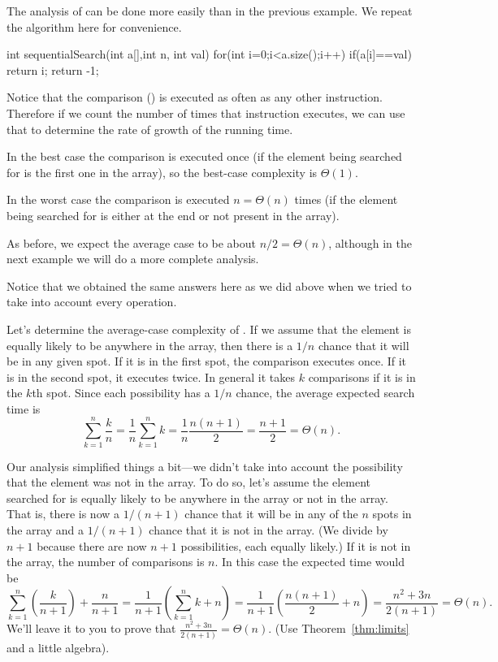 \begin{exa}
The analysis of  can be done more easily than in the
previous example.  
We repeat the algorithm here for convenience.
\begin{code}
    int sequentialSearch(int a[],int n, int val) {
        for(int i=0;i<a.size();i++) {
            if(a[i]==val) {
                return i;
            }
        }
        return -1;
    }
\end{code}
Notice that the comparison () is executed as often as any other instruction.
Therefore if we count the number of times that instruction executes, we can use that 
to determine the rate of growth of the running time.
  
In the best case the comparison is executed once (if the element being searched for is
the first one in the array), so the best-case complexity is $\Theta(1)$.

In the worst case the comparison is executed $n=\Theta(n)$ times
(if the element being searched for is either at the end or not present in the array).
  
As before, we expect the average case to be about $n/2=\Theta(n)$, although
in the next example we will do a more complete analysis.

Notice that we obtained the same answers here as we did above when we tried to 
take into account every operation.
\end{exa}

\begin{exa}
Let's determine the average-case complexity of .
If we assume that the element is equally likely to be anywhere in the array,
then there is a $1/n$ chance that it will be in any given spot.  If it is in the
first spot, the comparison executes once.  If it is in the second spot, it executes twice.
In general it takes $k$ comparisons if it is in the $k$th spot.
Since each possibility has a $1/n$ chance, the average expected search time is
$$\sum_{k=1}^{n}\frac{k}{n}=\frac{1}{n}\sum_{k=1}^{n}k=\frac{1}{n}\frac{n(n+1)}{2}
=\frac{n+1}{2}=\Theta(n).$$

Our analysis simplified things a bit---we didn't take into account the possibility that
the element was not in the array.  To do so, let's assume the element searched for is
equally likely to be anywhere in the array or not in the array.
That is, there is now a $1/(n+1)$ chance that it will be in any of the $n$ spots in the
array and a $1/(n+1)$ chance that it is not in the array. (We divide by $n+1$
because there are now $n+1$ possibilities, each equally likely.)  If it is not in the array,
the number of comparisons is $n$. 
In this case the expected time would be 
$$\sum_{k=1}^{n}\left(\frac{k}{n+1}\right) + \frac{n}{n+1}
=\frac{1}{n+1}\left(\sum_{k=1}^{n}k + n\right)
=\frac{1}{n+1}\left(\frac{n(n+1)}{2}+ n\right)
=\frac{n^2+3n}{2(n+1)}
=\Theta(n).$$
We'll leave it to you to prove that 
$\frac{n^2+3n}{2(n+1)} =\Theta(n)$. (Use Theorem~\ref{thm:limits} and a little algebra).
\end{exa}

